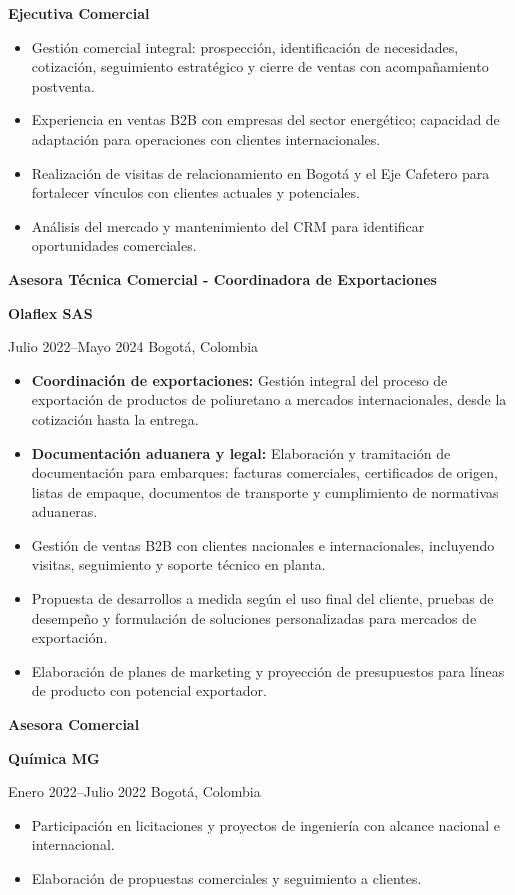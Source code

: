 \documentclass[10pt,a4paper]{altacv}
\renewcommand{\cvevent}[4]{%
  {\large\bfseries\color{emphasis}#1\par}
  \smallskip
  \textbf{\color{accent}#2}\par
  \smallskip
  {\small\faCalendar \hspace{0.5em}#3\hspace{2em}%
  \ifstrequal{#4}{}{}{\faMapMarker\hspace{0.5em}#4}\par}
  \medskip
}
\begin{document}
{\color{accent}\textbf{Ejecutiva Comercial}}
\begin{itemize}
\item Gestión comercial integral: prospección, identificación de necesidades, cotización, seguimiento estratégico y cierre de ventas con acompañamiento postventa.
\item Experiencia en ventas B2B con empresas del sector energético; capacidad de adaptación para operaciones con clientes internacionales.
\item Realización de visitas de relacionamiento en Bogotá y el Eje Cafetero para fortalecer vínculos con clientes actuales y potenciales.
\item Análisis del mercado y mantenimiento del CRM para identificar oportunidades comerciales.
\end{itemize}

\vspace{0.2 cm}
\cvevent{Asesora Técnica Comercial - Coordinadora de Exportaciones}{Olaflex SAS}{Julio 2022--Mayo 2024}{Bogotá, Colombia}

\begin{itemize}
\item \textbf{Coordinación de exportaciones:} Gestión integral del proceso de exportación de productos de poliuretano a mercados internacionales, desde la cotización hasta la entrega.
\item \textbf{Documentación aduanera y legal:} Elaboración y tramitación de documentación para embarques: facturas comerciales, certificados de origen, listas de empaque, documentos de transporte y cumplimiento de normativas aduaneras.
\item Gestión de ventas B2B con clientes nacionales e internacionales, incluyendo visitas, seguimiento y soporte técnico en planta.
\item Propuesta de desarrollos a medida según el uso final del cliente, pruebas de desempeño y formulación de soluciones personalizadas para mercados de exportación.
\item Elaboración de planes de marketing y proyección de presupuestos para líneas de producto con potencial exportador.
\end{itemize}

\cvevent{Asesora Comercial}{Química MG}{Enero 2022--Julio 2022}{Bogotá, Colombia}

\begin{itemize}
\item Participación en licitaciones y proyectos de ingeniería con alcance nacional e internacional.
\item Elaboración de propuestas comerciales y seguimiento a clientes.
\end{itemize}
\end{document}
